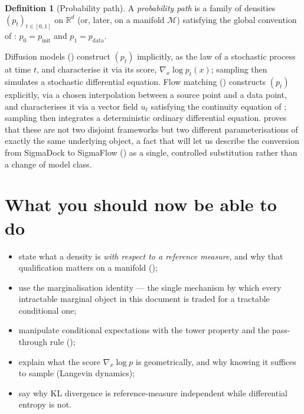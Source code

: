 \documentclass[11pt,a4paper]{report}
\theoremstyle{definition}
\newtheorem{definition}[definition]{Definition}
\theoremstyle{remark}
\newcommand{\RR}{\mathbb R}
\begin{document}
\begin{definition}[Probability path]
\label{def:prob-path}
A \emph{probability path} is a family of densities $(p_t)_{t\in[0,1]}$ on
$\RR^d$ (or, later, on a manifold $\mathcal M$) satisfying the global
convention of : $p_0 = p_{\mathrm{init}}$
and $p_1=p_{\mathrm{data}}$.
\end{definition}

Diffusion models () construct $(p_t)$ implicitly, as
the law of a stochastic process at time $t$, and characterise it via its
score, $\nabla_x\log p_t(x)$; sampling then simulates a stochastic
differential equation. Flow matching () constructs
$(p_t)$ explicitly, via a chosen interpolation between a source point and a
data point, and characterises it via a vector field $u_t$ satisfying the
continuity equation of ; sampling then integrates a
deterministic ordinary differential equation.
 proves that these are not two disjoint frameworks but two
different parameterisations of exactly the same underlying object, a fact
that will let us describe the conversion from SigmaDock to SigmaFlow
() as a single, controlled substitution rather than a
change of model class.


\section{What you should now be able to do}

\begin{itemize}[nosep]
\item state what a density is \emph{with respect to a reference measure}, and why that qualification matters on a manifold ();
\item use the marginalisation identity  --- the single mechanism by which every intractable marginal object in this document is traded for a tractable conditional one;
\item manipulate conditional expectations with the tower property and the pass-through rule ();
\item explain what the score $\nabla_x\log p$ is geometrically, and why knowing it suffices to sample (Langevin dynamics);
\item say why KL divergence is reference-measure independent while differential entropy is not.
\end{itemize}
\end{document}
